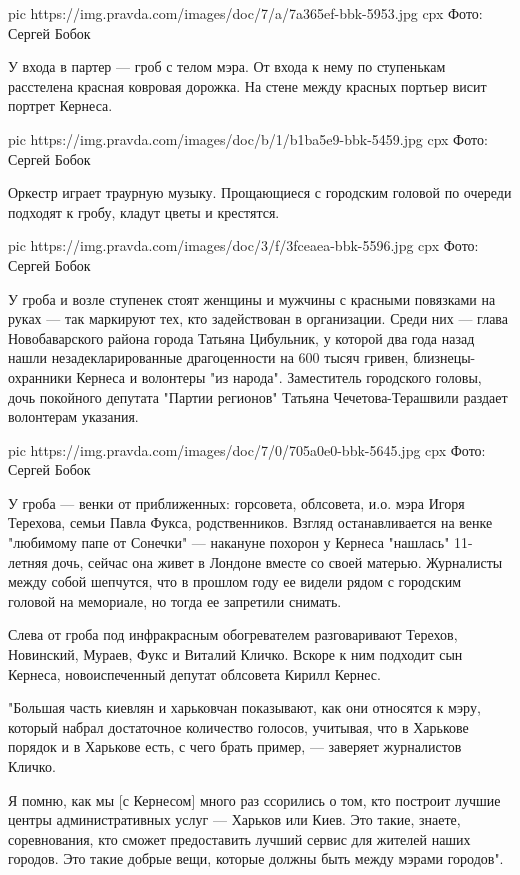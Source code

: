 \ifcmt
pic https://img.pravda.com/images/doc/7/a/7a365ef-bbk-5953.jpg
cpx Фото: Сергей Бобок
\fi

У входа в партер — гроб с телом мэра. От входа к нему по ступенькам расстелена
красная ковровая дорожка. На стене между красных портьер висит портрет Кернеса. 

\ifcmt
pic https://img.pravda.com/images/doc/b/1/b1ba5e9-bbk-5459.jpg
cpx Фото: Сергей Бобок
\fi

Оркестр играет траурную музыку. Прощающиеся с городским головой по очереди
подходят к гробу, кладут цветы и крестятся.

\ifcmt
pic https://img.pravda.com/images/doc/3/f/3fceaea-bbk-5596.jpg
cpx Фото: Сергей Бобок
\fi

У гроба и возле ступенек стоят женщины и мужчины с красными повязками на руках
— так маркируют тех, кто задействован в организации. Среди них — глава
Новобаварского района города Татьяна Цибульник, у которой два года назад нашли
незадекларированные драгоценности на 600 тысяч гривен, близнецы-охранники
Кернеса и волонтеры "из народа". Заместитель городского головы, дочь покойного
депутата "Партии регионов" Татьяна Чечетова-Терашвили раздает волонтерам
указания.

\ifcmt
pic https://img.pravda.com/images/doc/7/0/705a0e0-bbk-5645.jpg
cpx Фото: Сергей Бобок
\fi

У гроба — венки от приближенных: горсовета, облсовета, и.о. мэра Игоря
Терехова, семьи Павла Фукса, родственников. Взгляд останавливается на венке
"любимому папе от Сонечки" — накануне похорон у Кернеса "нашлась" 11-летняя
дочь, сейчас она живет в Лондоне вместе со своей матерью. Журналисты между
собой шепчутся, что в прошлом году ее видели рядом с городским головой на
мемориале, но тогда ее запретили снимать.

Слева от гроба под инфракрасным обогревателем разговаривают Терехов, Новинский,
Мураев, Фукс и Виталий Кличко. Вскоре к ним подходит сын Кернеса,
новоиспеченный депутат облсовета Кирилл Кернес.

"Большая часть киевлян и харьковчан показывают, как они относятся к мэру,
который набрал достаточное количество голосов, учитывая, что в Харькове порядок
и в Харькове есть, с чего брать пример, — заверяет журналистов Кличко. 

Я помню, как мы [с Кернесом] много раз ссорились о том, кто построит лучшие
центры административных услуг — Харьков или Киев. Это такие, знаете,
соревнования, кто сможет предоставить лучший сервис для жителей наших городов.
Это такие добрые вещи, которые должны быть между мэрами городов".  

